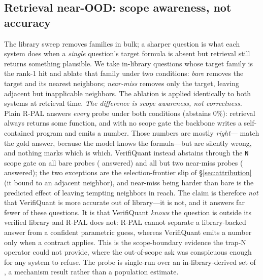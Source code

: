 \subsection{Retrieval near-OOD: scope awareness, not accuracy}\label{sec:nearood}
The library sweep removes families in bulk; a sharper question is what each system does when a \emph{single} question's target formula is absent but retrieval still returns something plausible.
We take \nearoodN{} in-library questions whose target family is the rank-1 hit and ablate that family under two conditions: \emph{bare} removes the target and its nearest neighbors; \emph{near-miss} removes only the target, leaving adjacent but inapplicable neighbors.
The ablation is applied identically to both systems at retrieval time.
\emph{The difference is scope awareness, not correctness.}
Plain R-PAL answers \emph{every} probe under both conditions (abstains 0\%): retrieval always returns some function, and with no scope gate the backbone writes a self-contained program and emits a number.
Those numbers are mostly \emph{right}---\nearoodRPALcorr{} match the gold answer, because the model knows the formula---but \nearoodRPALsw{} are silently wrong, and nothing marks which is which.
VerifiQuant instead abstains through the \texttt{N} scope gate on all \nearoodN{} bare probes (\nearoodVQbare{} answered) and all but two near-miss probes (\nearoodVQnear{} answered); the two exceptions are the selection-frontier slip of \S\ref{sec:attribution} (it bound to an adjacent neighbor), and near-miss being harder than bare is the predicted effect of leaving tempting neighbors in reach.
The claim is therefore \emph{not} that VerifiQuant is more accurate out of library---it is not, and it answers far fewer of these questions.
It is that VerifiQuant \emph{knows} the question is outside its verified library and R-PAL does not: R-PAL cannot separate a library-backed answer from a confident parametric guess, whereas VerifiQuant emits a number only when a contract applies.
This is the scope-boundary evidence the trap-N operator could not provide, where the out-of-scope ask was conspicuous enough for any system to refuse.
The probe is single-run over an in-library-derived set of \nearoodN{}, a mechanism result rather than a population estimate.

